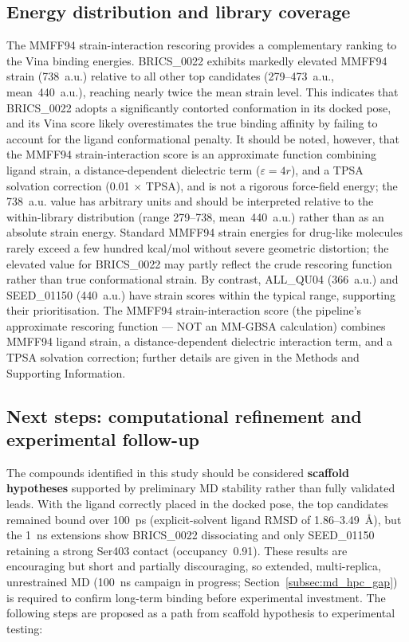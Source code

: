 \documentclass[12pt]{article}
\begin{document}
\subsection{Energy distribution and library coverage}
The MMFF94 strain-interaction rescoring provides a complementary ranking to the Vina binding energies. BRICS\_0022 exhibits markedly elevated MMFF94 strain (738~a.u.) relative to all other top candidates (279--473~a.u., mean~440~a.u.), reaching nearly twice the mean strain level. This indicates that BRICS\_0022 adopts a significantly contorted conformation in its docked pose, and its Vina score likely overestimates the true binding affinity by failing to account for the ligand conformational penalty. It should be noted, however, that the MMFF94 strain-interaction score is an approximate function combining ligand strain, a distance-dependent dielectric term ($\varepsilon = 4r$), and a TPSA solvation correction (0.01 $\times$ TPSA), and is not a rigorous force-field energy; the 738~a.u. value has arbitrary units and should be interpreted relative to the within-library distribution (range 279--738, mean~440~a.u.) rather than as an absolute strain energy. Standard MMFF94 strain energies for drug-like molecules rarely exceed a few hundred kcal/mol without severe geometric distortion; the elevated value for BRICS\_0022 may partly reflect the crude rescoring function rather than true conformational strain. By contrast, ALL\_QU04 (366~a.u.) and SEED\_01150 (440~a.u.) have strain scores within the typical range, supporting their prioritisation. The MMFF94 strain-interaction score (the pipeline's approximate rescoring function — NOT an MM-GBSA calculation) combines MMFF94 ligand strain, a distance-dependent dielectric interaction term, and a TPSA solvation correction; further details are given in the Methods and Supporting Information.

\subsection{Next steps: computational refinement and experimental follow-up}
The compounds identified in this study should be considered \textbf{scaffold hypotheses} supported by preliminary MD stability rather than fully validated leads. With the ligand correctly placed in the docked pose, the top candidates remained bound over 100~ps (explicit-solvent ligand RMSD of 1.86--3.49~\si{\angstrom}), but the 1~ns extensions show BRICS\_0022 dissociating and only SEED\_01150 retaining a strong Ser403 contact (occupancy~0.91). These results are encouraging but short and partially discouraging, so extended, multi-replica, unrestrained MD (100~ns campaign in progress; Section~\ref{subsec:md_hpc_gap}) is required to confirm long-term binding before experimental investment. The following steps are proposed as a path from scaffold hypothesis to experimental testing:
\end{document}
